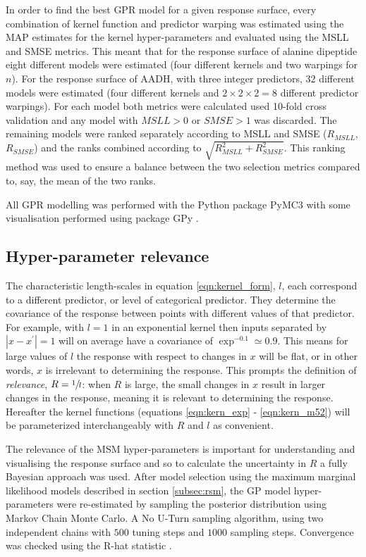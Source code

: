 In order to find the best GPR model for a given response surface, every combination of kernel function and  predictor warping was estimated using the MAP estimates for the kernel hyper-parameters and evaluated using the MSLL and SMSE metrics. This meant that for the response surface of alanine dipeptide eight different models were estimated (four different kernels and two warpings for $n$). For the response surface of AADH, with three integer predictors, $32$ different models were estimated (four different kernels and $2\times2\times2=8$ different predictor warpings). For each model both metrics were calculated used 10-fold cross validation and any model with $MSLL > 0$ or $SMSE > 1$ was discarded. The remaining models were ranked separately according to MSLL and SMSE ($R_{MSLL}$, $R_{SMSE}$) and the ranks combined according to $\sqrt{R_{MSLL}^2 + R_{SMSE}^2}$. This ranking method was used to ensure a balance between the two selection metrics compared to, say, the mean of the two ranks.  

All GPR modelling was performed with the Python package PyMC3 \cite{salvatierProbabilisticProgrammingPython2016} with some visualisation performed using package GPy \cite{gpy2014}. 

\subsection{Hyper-parameter relevance}\label{subsec:meth_rel}
The characteristic length-scales in equation \ref{eqn:kernel_form}, $l$, each correspond to a different predictor, or level of categorical predictor. They determine the covariance of the response between points with different values of that predictor. For example, with $l=1$ in an exponential kernel then inputs separated by $|x-x^{\prime}|= 1$ will on average have a covariance of $\exp^{-0.1}\simeq 0.9$. This means for large values of $l$ the response with respect to changes in $x$ will be flat, or in other words, $x$ is irrelevant to determining the response. This prompts the definition of \emph{relevance}, $R = \sfrac{1}{l}$: when $R$ is large, the small changes in $x$ result in larger changes in the response, meaning it is relevant to determining the response. Hereafter the kernel functions (equations \ref{eqn:kern_exp} - \ref{eqn:kern_m52}) will be parameterized interchangeably with $R$ and $l$ as convenient.  

The relevance of the MSM hyper-parameters is important for understanding and visualising the response surface and so to calculate the uncertainty in $R$ a fully Bayesian approach was used. After model selection using the maximum marginal likelihood models described in section \ref{subsec:rsm}, the GP model hyper-parameters were re-estimated by sampling the posterior distribution using Markov Chain Monte Carlo. A No U-Turn sampling algorithm, using two independent chains with $500$ tuning steps and $1000$ sampling steps. Convergence was checked using the R-hat statistic \cite{gelmanBayesianDataAnalysis2014}. 


